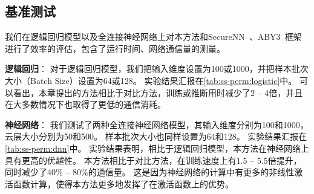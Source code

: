 \subsection{基准测试}
我们在逻辑回归模型以及全连接神经网络上对本方法和SecureNN~\cite{wagh2019securenn}、ABY3~\cite{mohassel2018aby3}框架进行了效率的评估，包含了运行时间、网络通信量的测量。

\textbf{逻辑回归}：
对于逻辑回归模型，我们把输入维度设置为100或1000，并把样本批次大小（Batch Size）设置为64或128。
实验结果汇报在\ref{tab:ss-perm:logistic}中。
可以看出，本章提出的方法相比于对比方法，训练或推断用时减少了2 -- 4倍，并且在大多数情况下也取得了更低的通信消耗。
%



\textbf{神经网络}：
我们测试了两种全连接神经网络模型，其输入维度分别为100和1000，云层大小分别为50和500。
样本批次大小也同样设置为64和128。
实验结果汇报在\ref{tab:ss-perm:dnn}中。
%
实验结果表明，相比于逻辑回归模型，本方法在神经网络上具有更高的优越性。
本方法相比于对比方法，在训练速度上有1.5 -- 5.5倍提升，同时减少了40\% -- 80\%的通信量。
这是因为神经网络的计算中有更多的非线性激活函数计算，使得本方法更多地发挥了在激活函数上的优势。
%



